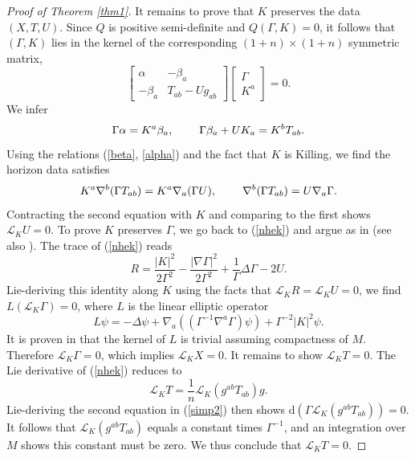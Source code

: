 \documentclass[11pt, reqno]{amsart}
\theoremstyle{plain}
\theoremstyle{definition}
\numberwithin{equation}{section}
\begin{document}
\begin{proof}[Proof of Theorem \ref{thm1}]
It remains to prove that $K$ preserves the data $(X,T,U)$. Since $Q$ is positive semi-definite and $Q(\Gamma,K) = 0$, it follows that $(\Gamma,K)$ lies in the kernel of the corresponding $(1+n) \times (1+n)$ symmetric matrix, 
\begin{equation*}
    \begin{bmatrix}
        \alpha & -\beta_a \\ -\beta_a & T_{ab} - Ug_{ab}
    \end{bmatrix} \begin{bmatrix} \Gamma \\ K^a \end{bmatrix} = 0.
\end{equation*}
We infer 
 \begin{equation} \label{simp1}
        \Gamma \alpha = K^a \beta_a, \hspace{.8cm} \Gamma \beta_a + U K_a = K^bT_{ab}.
    \end{equation}
    Using the relations (\ref{beta}, \ref{alpha}) and the fact that $K$ is Killing, we find the horizon data satisfies
    \begin{equation} \label{simp2}
        K^a\nabla^b(\Gamma T_{ab}) = K^a\nabla_a(\Gamma U), \hspace{.8cm} \nabla^b(\Gamma T_{ab}) = U\nabla_a \Gamma.
    \end{equation}
    Contracting the second equation with $K$ and comparing to the first shows $\mathcal{L}_K U = 0$. To prove $K$ preserves $\Gamma$, we go back to (\ref{nhek}) and argue as in \cite{CDKL} (see also \cite{GSW25}). The trace of (\ref{nhek}) reads
        \begin{equation*}
        R = \frac{\vert K \vert^2}{2\Gamma^2} - \frac{\vert \nabla \Gamma \vert^2}{2\Gamma^2} + \frac{1}{\Gamma}\Delta \Gamma - 2U.
    \end{equation*}
    Lie-deriving this identity along $K$ using the facts that $\mathcal{L}_K R = \mathcal{L}_K U = 0$, we find  $L(\mathcal{L}_K\Gamma) = 0$, where $L$ is the linear elliptic operator
    \begin{equation}
        L\psi = -\Delta \psi + \nabla_a((\Gamma^{-1}\nabla^a\Gamma)\psi) + \Gamma^{-2}\vert K \vert^2 \psi.
    \end{equation}
    It is proven in \cite{CDKL} that the kernel of $L$ is trivial assuming compactness of $M$. Therefore $\mathcal{L}_K \Gamma = 0$, which implies $\mathcal{L}_K X = 0$. It remains to show $\mathcal{L}_K T = 0$. The Lie derivative of (\ref{nhek}) reduces to
    \begin{equation*}
        \mathcal{L}_K T = \frac 1n\mathcal{L}_K(g^{ab}T_{ab})g.
    \end{equation*}
    Lie-deriving the second equation in (\ref{simp2}) then shows d$(\Gamma \mathcal{L}_K (g^{ab}T_{ab})) = 0$. It follows that $\mathcal{L}_K (g^{ab}T_{ab})$ equals a constant times $\Gamma^{-1}$, and an integration over $M$ shows this constant must be zero. We thus conclude that $\mathcal{L}_K T = 0$.
\end{proof}
\end{document}
